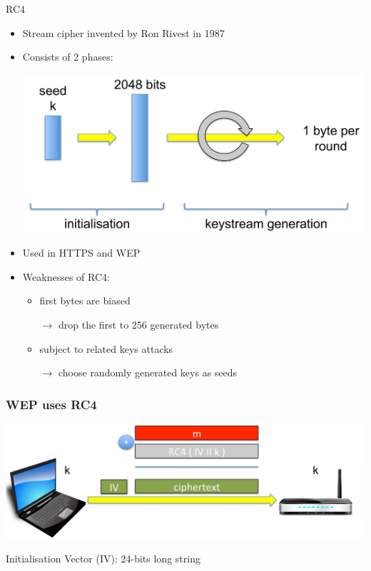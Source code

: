 \documentclass[aspectratio=169, lualatex, handout, 10pt,dvipsnames,svgnames]{beamer} %
\def\enrouge#1{\textcolor{rouge}{#1}}
\begin{document}
\begin{frame}{RC4}

  \begin{itemize}
  \item Stream cipher invented by Ron Rivest in 1987 
    \pause
    \medskip{}
    
  \item Consists of 2 phases:
    \begin{center}
      \includegraphics[scale=0.25]{Images/RC4.pdf}
    \end{center}
    \pause

  \item Used in HTTPS and WEP
    \medskip{}
    \pause

  \item Weaknesses of RC4:
    \begin{itemize}
    \item \enrouge{first bytes are biased}
      
      \enrouge{$\longrightarrow$ drop the first to 256 generated bytes}
      \pause

    \item \enrouge{subject to related keys attacks}

      \enrouge{$\longrightarrow$ choose randomly generated keys as seeds}
    \end{itemize}
  \end{itemize}

\end{frame}

\begin{frame}
  \frametitle{WEP uses RC4}

  \includegraphics[scale=0.4]{Images/WEP.pdf}
  \bigskip{}

  Initialisation Vector (IV): 24-bits long string
  
\end{frame}
\end{document}
